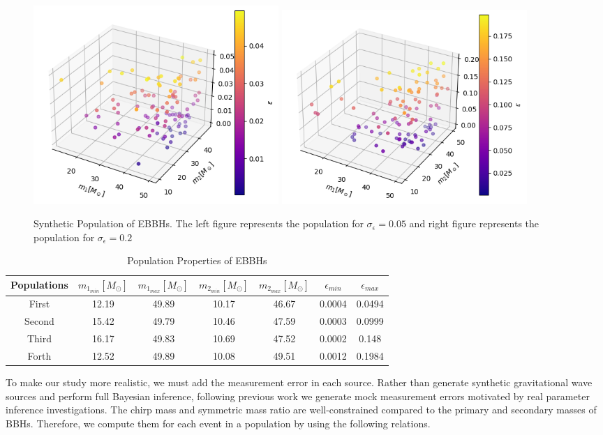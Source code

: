 \documentclass[twocolumn,prd,nofootinbib]{revtex4}
\begin{document}
\begin{figure}[]
\includegraphics[width=0.45\textwidth]{paper/figures/pop3d_0.05.png}
\includegraphics[width=0.45\textwidth]{paper/figures/pop3d_0.2.png}
\caption{\label{fig:pop3d0.05_0.2} Synthetic Population of EBBHs. The left figure represents the population for $\sigma_\epsilon=0.05$ and right figure represents the population for $\sigma_\epsilon=0.2$}
\end{figure}


\begin{table}[]
    \centering
    \begin{tabular}{c|cccccc}
        \hline \hline
        Populations & $m_{1_{min}} [M_\odot] $ & $m_{1_{max}} [M_\odot]$ & $m_{2_{min}} [M_\odot]$ & $m_{2_{max}} [M_\odot]$ & $\epsilon_{min}$ & $\epsilon_{max}$\\ \hline
        First  & 12.19 & 49.89 & 10.17 & 46.67 & 0.0004 & 0.0494\\ \hline
        Second  & 15.42 & 49.79 & 10.46 & 47.59 & 0.0003 & 0.0999\\ \hline
        Third  & 16.17 & 49.83 & 10.69 & 47.52 & 0.0002 & 0.148\\ \hline
        Forth  & 12.52 & 49.89 & 10.08 & 49.51 & 0.0012 & 0.1984\\ \hline
    \end{tabular}
    \caption{Population Properties of EBBHs}
    \label{tab:pop_prop}
\end{table}

To make our study more realistic, we must add the measurement error in each source.  Rather than generate synthetic gravitational wave sources and perform full Bayesian inference, following previous work \cite{Mandel_2017_Errors} we generate mock measurement errors motivated by real parameter inference investigations. The chirp mass and symmetric mass ratio are well-constrained compared to the primary and secondary masses of BBHs. Therefore, we compute them for each event in a population by using the following relations.
\end{document}
